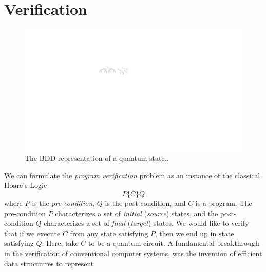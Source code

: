 \section{Verification}

\begin{figure}[ht] 
    \centering
    \includegraphics[scale=0.9]{Figures/BDDs/BDDs} 
    \caption{The BDD representation of a quantum state..}
    \label{BDD:fig}
\end{figure}
%
We can formulate the {\it program verification} problem as an instance of the classical Hoare's Logic
\[
P \{C\} Q
\]
where $P$ is the {\it pre-condition}, $Q$ is the post-condition, and $C$ is a program.
%
The pre-condition $P$ characterizes a set of {\it initial} ({\it source}) states, and the post-condition $Q$ characterizes a set of {\it final} ({\it target}) states.
%
We would like to verify that if we execute $C$ from any state satisfying $P$, then we end up in state satisfying $Q$.
%
Here, take $C$ to be a quantum circuit.
%
A fundamental breakthrough in the verification of conventional computer systems, was the invention of efficient data structuires to represent  
